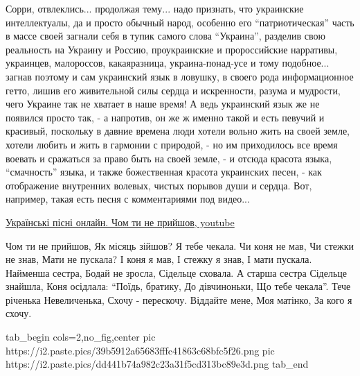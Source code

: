 Сорри, отвлеклись... продолжая тему... надо признать, что украинские
интеллектуалы, да и просто обычный народ, особенно его \enquote{патриотическая}
часть в массе своей загнали себя в тупик самого слова \enquote{Украина},
разделив свою реальность на Украину и Россию, проукраинские и пророссийские
нарративы, украинцев, малороссов, какаяразница, украина-понад-усе и тому
подобное... загнав поэтому и сам украинский язык в ловушку, в своего рода
информационное гетто, лишив его живительной силы сердца и искренности, разума и
мудрости, чего Украине так не хватает в наше время! А ведь украинский язык же
не появился просто так, - а напротив, он же ж именно такой и есть певучий и
красивый, поскольку в давние времена люди хотели вольно жить на своей земле,
хотели любить и жить в гармонии с природой, - но им приходилось все время
воевать и сражаться за право быть на своей земле, - и отсюда красота языка,
\enquote{смачность} языка,  и также божественная красота украинских песен, -
как отображение внутренних волевых, чистых порывов души и сердца. Вот,
например, такая есть песня с комментариями под видео... 

\href{https://www.youtube.com/watch?v=--iWRp8Jr6k}{%
Українські пісні онлайн. Чом ти не прийшов, youtube}

\raggedcolumns
\begin{multicols}{4} %
\setlength{\parindent}{0pt}
\obeycr
Чом ти не прийшов,
Як місяць зійшов?
Я тебе чекала.
Чи коня не мав,
Чи стежки не знав,
Мати не пускала?
\smallskip
І коня я мав,
І стежку я знав,
І мати пускала.
Найменша сестра,
Бодай не зросла,
Сідельце сховала.
\smallskip
А старша сестра
Сідельце знайшла,
Коня осідлала:
\enquote{Поїдь, братику,
До дівчиноньки,
Що тебе чекала}.
\smallskip
Тече річенька
Невеличенька,
Схочу - перескочу.
Віддайте мене,
Моя матінко,
За кого я схочу.
\restorecr
\end{multicols} %

\ifcmt
  tab_begin cols=2,no_fig,center
     pic https://i2.paste.pics/39b5912a65683fffc41863c68bfc5f26.png
		 pic https://i2.paste.pics/dd441b74a982c23a31f5cd313bc89e3d.png
  tab_end
\fi

